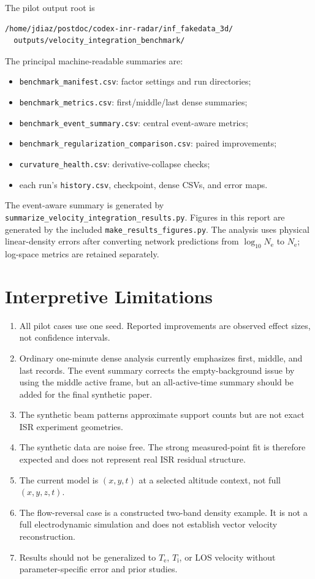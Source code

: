 \documentclass[11pt]{article}
\newcommand{\Ne}{N_{\mathrm e}}
\newcommand{\Te}{T_{\mathrm e}}
\newcommand{\Ti}{T_{\mathrm i}}
\begin{document}
The pilot output root is
\begin{verbatim}
/home/jdiaz/postdoc/codex-inr-radar/inf_fakedata_3d/
  outputs/velocity_integration_benchmark/
\end{verbatim}
The principal machine-readable summaries are:
\begin{itemize}
  \item \texttt{benchmark\_manifest.csv}: factor settings and run directories;
  \item \texttt{benchmark\_metrics.csv}: first/middle/last dense summaries;
  \item \texttt{benchmark\_event\_summary.csv}: central event-aware metrics;
  \item \texttt{benchmark\_regularization\_comparison.csv}: paired improvements;
  \item \texttt{curvature\_health.csv}: derivative-collapse checks;
  \item each run's \texttt{history.csv}, checkpoint, dense CSVs, and error maps.
\end{itemize}

The event-aware summary is generated by
\texttt{summarize\_velocity\_integration\_results.py}. Figures in this report are generated by the included
\texttt{make\_results\_figures.py}. The analysis uses physical linear-density errors after converting network
predictions from $\log_{10}\Ne$ to $\Ne$; log-space metrics are retained separately.

\section{Interpretive Limitations}

\begin{enumerate}
  \item All pilot cases use one seed. Reported improvements are observed effect sizes, not confidence
  intervals.
  \item Ordinary one-minute dense analysis currently emphasizes first, middle, and last records. The event
  summary corrects the empty-background issue by using the middle active frame, but an all-active-time summary
  should be added for the final synthetic paper.
  \item The synthetic beam patterns approximate support counts but are not exact ISR experiment geometries.
  \item The synthetic data are noise free. The strong measured-point fit is therefore expected and does not
  represent real ISR residual structure.
  \item The current model is $(x,y,t)$ at a selected altitude context, not full $(x,y,z,t)$.
  \item The flow-reversal case is a constructed two-band density example. It is not a full electrodynamic
  simulation and does not establish vector velocity reconstruction.
  \item Results should not be generalized to $\Te$, $\Ti$, or LOS velocity without parameter-specific error
  and prior studies.
\end{enumerate}
\end{document}
